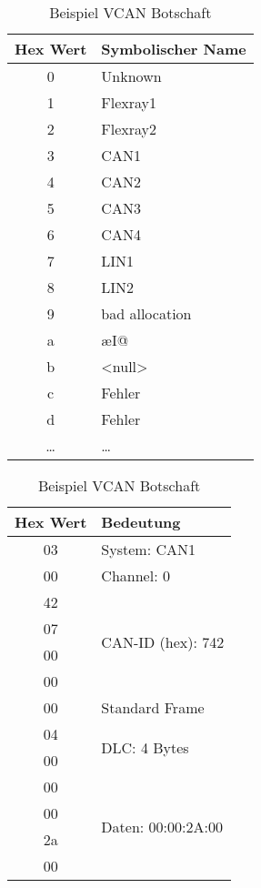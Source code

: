 \begin{table}[ht]
    \centering
    \begin{minipage}{0.45\textwidth}		
        \begin{tabular}[h]{c l}
            Hex Wert & Symbolischer Name \\
            \toprule
            0 & Unknown\\
            1 & Flexray1\\
            2 & Flexray2\\
            3 & CAN1\\
            4 & CAN2\\
            5 & CAN3\\
            6 & CAN4\\
            7 & LIN1\\
            8 & LIN2\\
            9 & bad allocation\\
            a & æI@\\
            b & <null>\\
            c & Fehler\\
            d & Fehler\\
            \dots & \dots\\
            \bottomrule
        \end{tabular}
        \caption{Liste der VCAN Systeme}
        \label{tab:vcansysteme}
    \end{minipage}\hfill
    \begin{minipage}{0.45\textwidth}
        \begin{tabular}[h]{c l}
            Hex Wert & Bedeutung \\
            \toprule
            03 & System: CAN1\\
            \midrule
            00 & Channel: 0\\
            \midrule
            42 & \multirow{4}{*}{CAN-ID (hex): 742}\\
            07 & \\
            00 & \\
            00 & \\
            \midrule
            00 & Standard Frame\\
            \midrule
            04 & \multirow{2}{*}{DLC: 4 Bytes}\\
            00 & \\
            \midrule
            00 & \multirow{4}{*}{Daten: 00:00:2A:00}\\
            00 & \\
            2a & \\
            00 & \\
            \bottomrule
        \end{tabular}
        \caption{Beispiel VCAN Botschaft}
        \label{tab:vcanbotschaft}
    \end{minipage}
\end{table}

